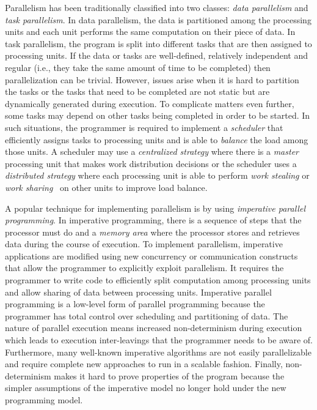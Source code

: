 Parallelism has been traditionally classified into two classes: \emph{data
parallelism} and \emph{task parallelism}. In data parallelism, the data is
partitioned among the processing units and each unit performs the same
computation on their piece of data. In task parallelism, the program is split
into different tasks that are then assigned to processing units. If the data or
tasks are well-defined, relatively independent and regular (i.e., they take the
same amount of time to be completed) then parallelization can be trivial.
However, issues arise when it is hard to partition the tasks or the tasks that
need to be completed are not static but are dynamically generated during
execution. To complicate matters even further, some tasks may depend on other
tasks being completed in order to be started. In such situations, the programmer
is required to implement a \emph{scheduler} that efficiently assigns tasks to
processing units and is able to \emph{balance} the load among those units. A
scheduler may use a \emph{centralized strategy} where there is a \emph{master}
processing unit that makes work distribution decisions or the scheduler uses a
\emph{distributed strategy} where each processing unit is able to perform
\emph{work stealing} or \emph{work sharing}~\cite{Blumofe:1999} on other units
to improve load balance.

A popular technique for implementing parallelism is by using \emph{imperative
parallel programming}. In imperative programming, there is a sequence of steps
that the processor must do and a \emph{memory area} where the processor stores
and retrieves data during the course of execution. To implement parallelism,
imperative applications are modified using new concurrency or communication
constructs that allow the programmer to explicitly exploit parallelism. It
requires the programmer to write code to efficiently split computation among
processing units and allow sharing of data between processing units. Imperative
parallel programming is a low-level form of parallel programming because the
programmer has total control over scheduling and partitioning of data. The
nature of parallel execution means increased non-determinism during execution
which leads to execution inter-leavings that the programmer needs to be aware
of.  Furthermore, many well-known imperative algorithms are not easily
parallelizable and require complete new approaches to run in a scalable fashion.
Finally, non-determinism makes it hard to prove properties of the program
because the simpler assumptions of the imperative model no longer hold under the
new programming model.

